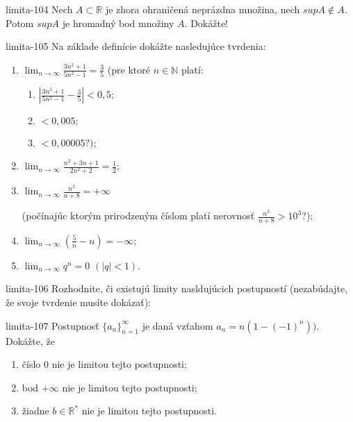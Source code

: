 \begin{defproblem}{limita-104}
Nech $A \subset \mathbb{R}$ je zhora ohraničená neprázdna množina, nech $sup A \notin A$. Potom $sup A$ je hromadný bod množiny $A$. Dokážte!
\end{defproblem}

\begin{defproblem}{limita-105}
 Na základe definície dokážte nasledujúce tvrdenia:
 \begin{enumerate}
 \item $\lim_{n \rightarrow \infty} \frac{3n^2+1}{5n^2-1}=\frac{3}{5}$ (pre ktoré $n \in \mathbb{N}$ platí:
 \begin{enumerate}
 \item $|\frac{3n^2+1}{5n^2-1}-\frac{3}{5}|<0,5;$
 \item $<0,005;$
 \item $<0,00005 ?);$
 \end{enumerate}

 \item $\lim_{n \rightarrow \infty} \frac{n^2+3n+1}{2n^2+2}=\frac{1}{2}$;
 \item $\lim_{n \rightarrow \infty} \frac{n^2}{n+8}=+\infty$

 (počínajúc ktorým prirodzeným číslom platí nerovnosť $\frac{n^2}{n+8}>10^3$?);
 \item $\lim_{n \rightarrow \infty} (\frac{5}{n}-n)=-\infty$;
 \item $\lim_{n \rightarrow \infty} q^n=0$  $(|q|<1).$
 \end{enumerate}
\end{defproblem}

\begin{defproblem}{limita-106}
Rozhodnite, či existujú limity nasldujúcich postupností (nezabúdajte, že svoje
tvrdenie musíte dokázať):
\end{defproblem}

\begin{defproblem}{limita-107}
Postupnosť ${\{a_n\}}_{n=1}^\infty$ je daná vzťahom $a_n=n(1-(-1)^n)).$ Dokážte, že
\begin{enumerate}
\item číslo $0$ nie je limitou tejto postupnosti;
\item bod $+\infty$ nie je limitou tejto postupnosti;
\item žiadne $b \in \mathbb{R^*}$ nie je limitou tejto postupnosti.
\end{enumerate}
\end{defproblem}

